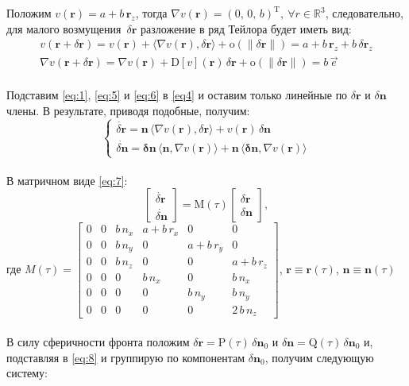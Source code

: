 \documentclass{article}
\newcommand{\bfv}[1]{\mathbf{#1}}
\newcommand{\dd}[1]{\dot{#1}}
\newcommand{\dv}[1]{\nabla v(#1)}
\newcommand{\ddv}[1]{\mathrm{D}[v](#1)}
\newcommand{\dr}{\delta \bfv{r}}
\newcommand{\dn}{\delta \bfv{n}}
\newcommand{\om}[1]{\mathrm{o}(#1)}
\newcommand{\dprod}[2]{\langle #1, #2 \rangle}
\newcommand{\T}[1]{#1^\mathrm{T}}
\newcommand{\matr}[1]{\mathrm{#1}}
\newcommand{\R}{\mathbb{R}}
\begin{document}
Положим $v(\bfv{r}) = a + b\,\bfv{r}_z$, тогда $\dv{\bfv{r}} = \T{(0,\,0,\,b)}, \ \forall r \in \R^3$, следовательно, для малого возмущения~$\dr$ разложение в ряд Тейлора будет иметь вид:
\begin{gather} \label{eq:5} 
v(\bfv{r} + \dr) = v(\bfv{r}) + \dprod{\dv{\bfv{r}}}{\dr} + \om{\|\dr\|} = a + b\,\bfv{r}_z + b\,\dr_z\\ 
\label{eq:6} 
\dv{\bfv{r} + \dr} = \dv{\bfv{r}} + \ddv{\bfv{r}}\,\dr + \om{\|\dr\|} = b\,\vec{e}
\end{gather}\\
Подставим \eqref{eq:1}, \eqref{eq:5} и \eqref{eq:6} в \eqref{eq4} и оставим только линейные по $\dr$ и $\dn$ члены. В результате, приводя подобные, получим:
\begin{equation} \label{eq:7}
\begin{cases}
\dd{\dr} = \bfv{n}\,\dprod{\dv{\bfv{r}}}{\dr} + v(\bfv{r})\,\dn\\
\dd{\dn} = \bfv{\dn}\,\dprod{\bfv{n}}{\dv{\bfv{r}}} + \bfv{n}\,\dprod{\bfv{\dn}}{\dv{\bfv{r}}}
\end{cases}
\end{equation}\\
В матричном виде \eqref{eq:7}:
\begin{equation} \label{eq:8}
\begin{bmatrix}
    \dd{\dr}\\
    \dd{\dn}
\end{bmatrix} = \matr{M}(\tau) 
\begin{bmatrix}
    \dr\\
    \dn
\end{bmatrix},
\end{equation} где $ M(\tau) = \begin{bmatrix}
    0 & 0 & b\,n_x & a + b\,r_x & 0 & 0\\
    0 & 0 & b\,n_y & 0 & a + b\,r_y & 0\\
    0 & 0 & b\,n_z & 0 & 0 & a + b\,r_z\\
    0 & 0 & 0 & b\,n_x & 0 & b\,n_x\\
    0 & 0 & 0 & 0 & b\,n_y & b\,n_y\\
    0 & 0 & 0 & 0 & 0 & 2\,b\,n_z
\end{bmatrix}$, $\bfv{r} \equiv \bfv{r}(\tau)$, $\bfv{n} \equiv \bfv{n}(\tau)$\\\\
В силу сферичности фронта положим $\dr = \matr{P}(\tau)\,\dn_0$ и $\dn = \matr{Q}(\tau)\,\dn_0$ и, подставляя в \eqref{eq:8} и группирую по компонентам $\dn_0$, получим следующую систему:\\
\end{document}
